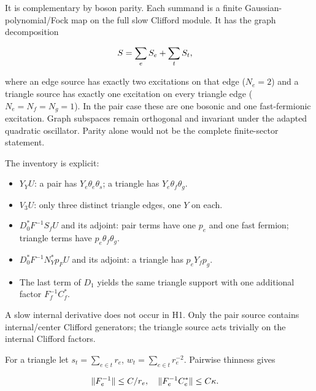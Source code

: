 It is complementary by boson parity. Each summand is a finite
Gaussian-polynomial/Fock map on the full slow Clifford module. It has
the graph decomposition

\begin{gather*}
\begin{aligned}
& S=\sum _{e} S_{e}+\sum _{t} S_{t},
\end{aligned}\notag
\end{gather*}

where an edge source has exactly two excitations on that edge
(\(N_{e}=2\)) and a triangle source has exactly one excitation on every
triangle edge (\(N_{e}=N_{f}=N_{g}=1\)). In the pair case these are one
bosonic and one fast-fermionic excitation. Graph subspaces remain
orthogonal and invariant under the adapted quadratic oscillator. Parity
alone would not be the complete finite-sector statement.

The inventory is explicit:

\begin{itemize}
\tightlist
\item
  \(Y_{Y} U\): a pair has \(Y_{e} \theta _{e} \theta _{s}\); a triangle
  has \(Y_{e} \theta _{f} \theta _{g}\).
\item
  \(V_{3} U\): only three distinct triangle edges, one \(Y\) on each.
\item
  \(D_{0}^{*}F^{-1} S_{f} U\) and its adjoint: pair terms have one
  \(p_{e}\) and one fast fermion; triangle terms have
  \(p_{e} \theta _{f} \theta _{g}\).
\item
  \(D_{0}^{*}F^{-1} N_{Y}^{*}p_{F} U\) and its adjoint: a triangle has
  \(p_{e} Y_{f} p_{g}\).
\item
  The last term of \(D_{1}\) yields the same triangle support with one
  additional factor \(F_{f}^{-1} C_{f}^{*}\).
\end{itemize}

A slow internal derivative does not occur in H1. Only the pair source
contains internal/center Clifford generators; the triangle source acts
trivially on the internal Clifford factors.

For a triangle let \(s_{t}=\sum _{e \in  t}r_{e}\),
\(w_{t}=\sum _{e \in  t}r_{e}^{-2}\). Pairwise thinness gives

\begin{gather*}
\begin{aligned}
& \Vert F_{e}^{-1}\Vert  \le  C/r_{e}, \quad  \Vert F_{e}^{-1} C_{e}^{*}\Vert  \le  C \kappa .
\end{aligned}\notag
\end{gather*}

